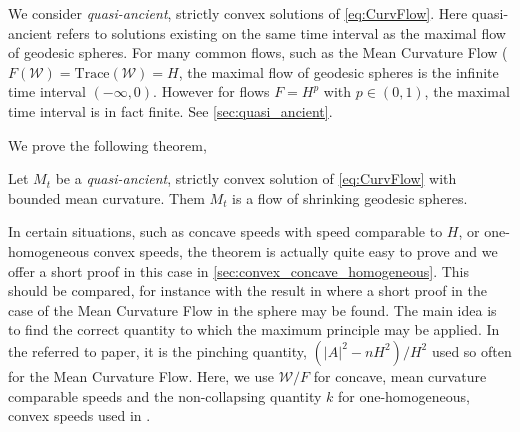 \documentclass{amsart}
\begin{document}
We consider \emph{quasi-ancient}, strictly convex solutions of \eqref{eq:CurvFlow}. Here quasi-ancient refers to solutions existing on the same time interval as the maximal flow of geodesic spheres. For many common flows, such as the Mean Curvature Flow (\(F(\mathcal{W}) = \text{Trace}(\mathcal{W}) = H\), the maximal flow of geodesic spheres is the infinite time interval \((-\infty, 0)\). However for flows \(F = H^p\) with \(p \in (0,1)\), the maximal time interval is in fact finite. See \cref{sec:quasi_ancient}.

We prove the following theorem,
\begin{theorem}
Let \(M_t\) be a \emph{quasi-ancient}, strictly convex solution of \eqref{eq:CurvFlow} with bounded mean curvature. Them \(M_t\) is a flow of shrinking geodesic spheres.
\end{theorem}

In certain situations, such as concave speeds with speed comparable to \(H\), or one-homogeneous convex speeds, the theorem is actually quite easy to prove and we offer a short proof in this case in \cref{sec:convex_concave_homogeneous}. This should be compared, for instance with the result in \cite[Theorem]{HuiskenSinestrari:05/2014} where a short proof in the case of the Mean Curvature Flow in the sphere may be found. The main idea is to find the correct quantity to which the maximum principle may be applied. In the referred to paper, it is the pinching quantity, \((|A|^2 - n H^2)/H^2\) used so often for the Mean Curvature Flow. Here, we use \(\mathcal{W}/F\) for concave, mean curvature comparable speeds and the non-collapsing quantity \(k\) for one-homogeneous, convex speeds used in \cite{andrews2015Non-collapsing}.
\end{document}
